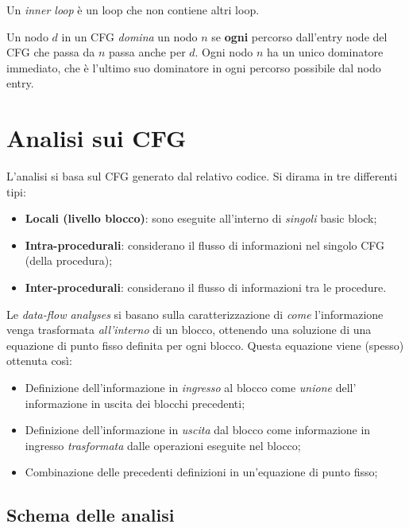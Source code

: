 \documentclass[a4paper,12pt,openany]{article}
\newenvironment{definition}[1][Definizione]{\begin{trivlist}
\item[\hskip \labelsep {\bfseries #1}]}{\end{trivlist}}
\begin{document}
\begin{definition}[Inner Loop]
    Un \emph{inner loop} è un loop che non contiene altri loop.
\end{definition}

\begin{definition}[Relazione di Dominance]
    Un nodo $d$ in un CFG \emph{domina} un nodo $n$ se \textbf{ogni} percorso dall'entry node del CFG che 
    passa da $n$ passa anche per $d$. Ogni nodo $n$ ha un unico dominatore immediato, che è l'ultimo suo
    dominatore in ogni percorso possibile dal nodo entry.
\end{definition}

\section{Analisi sui CFG}
L'analisi si basa sul CFG generato dal relativo codice. Si dirama in tre differenti tipi:
\begin{itemize}
	\item \textbf{Locali (livello blocco)}: sono eseguite all'interno di \emph{singoli} basic block;
	\item \textbf{Intra-procedurali}: considerano il flusso di informazioni nel singolo CFG (della procedura);
	\item \textbf{Inter-procedurali}: considerano il flusso di informazioni tra le procedure.
\end{itemize}
Le \emph{data-flow analyses} si basano sulla caratterizzazione di \emph{come} l'informazione venga trasformata
\emph{all'interno} di un blocco, ottenendo una soluzione di una equazione di punto fisso definita per ogni
blocco. Questa equazione viene (spesso) ottenuta così:
\begin{itemize}
    \item Definizione dell'informazione in \emph{ingresso} al blocco come \emph{unione} dell' informazione
        in uscita dei blocchi precedenti;
    \item Definizione dell'informazione in \emph{uscita} dal blocco come informazione in ingresso 
        \emph{trasformata} dalle operazioni eseguite nel blocco;
    \item Combinazione delle precedenti definizioni in un'equazione di punto fisso;
\end{itemize}

\subsection{Schema delle analisi}
\end{document}
